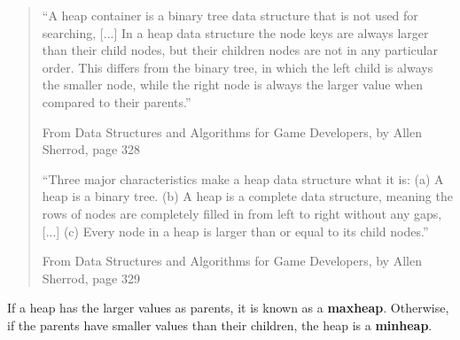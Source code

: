 \documentclass[a4paper,12pt,oneside]{book}
\begin{document}
        \begin{quote}
            ``A heap container is a binary tree data structure that is not used for searching, [...]
            In a heap data structure the node keys are always larger than their child nodes,
            but their children nodes are not in any particular order. This differs
            from the binary tree, in which the left child is always the smaller node,
            while the right node is always the larger value when compared to their parents.''
            
            \footnotesize
            From Data Structures and Algorithms for Game Developers, by Allen Sherrod, page 328

            \normalsize

            ``Three major characteristics make a heap data structure what it is: (a) A heap is
            a binary tree. (b) A heap is a complete data structure, meaning the rows of nodes are completely
            filled in from left to right without any gaps, [...] (c) Every node in a heap is larger
            than or equal to its child nodes.''

            \footnotesize
            From Data Structures and Algorithms for Game Developers, by Allen Sherrod, page 329            
        \end{quote}

        If a heap has the larger values as parents, it is known as a \textbf{maxheap}.
        Otherwise, if the parents have smaller values than their children, the heap is a \textbf{minheap}.

    \hrulefill
\end{document}
